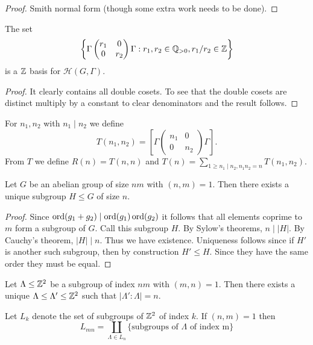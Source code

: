 \documentclass{memoir}
\begin{document}
\begin{proof}
    Smith normal form (though some extra work needs to be done).
\end{proof}
\begin{corollary}
    The set
    \begin{equation}
        \left\{ \Gamma \begin{pmatrix} r_1 & 0 \\ 0 & r_2 \end{pmatrix} \Gamma : r_1,r_2\in \mathbb{Q}_{>0}, r_1/r_2\in\mathbb{Z} \right\}
    \end{equation}
    is a $\mathbb{Z}$ basis for $\mathcal H(G,\Gamma)$.
\end{corollary}
\begin{proof}
    It clearly contains all double cosets.
    To see that the double cosets are distinct multiply by a constant to clear denominators and the result follows.
\end{proof}
\begin{notation}
    For $n_1,n_2$ with $n_1\mid n_2$ we define
    \begin{equation}
    T(n_1,n_2) = \left[ \Gamma \begin{pmatrix} n_1 & 0 \\ 0 & n_2\end{pmatrix} \Gamma \right].
    \end{equation}
    From $T$ we define $R(n) = T(n,n)$ and $T(n) = \sum_{1\ge n_1\mid n_2, n_1n_2 = n} T(n_1,n_2)$.
\end{notation}
\begin{lemma}
    Let $G$ be an abelian group of size $nm$ with $(n,m) = 1$.
    Then there exists a unique subgroup $H\le G$ of size $n$.
\end{lemma}
\begin{proof}
    Since $\operatorname{ord}(g_1+g_2)\mid \operatorname{ord}(g_1)\operatorname{ord}(g_2)$ it follows that all elements coprime to $m$ form a subgroup of $G$.
    Call this subgroup $H$.
    By Sylow's theorems, $n\mid |H|$.
    By Cauchy's theorem, $|H|\mid n$.
    Thus we have existence.
    Uniqueness follows since if $H'$ is another such subgroup, then by construction $H'\le H$.
    Since they have the same order they must be equal.
\end{proof}
\begin{corollary}
    Let $\Lambda\le \mathbb{Z}^2$ be a subgroup of index $nm$ with $(m,n)=1$. 
    Then there exists a unique $\Lambda\le\Lambda'\le \mathbb{Z}^2$ such that $|\Lambda':\Lambda| = n$.
\end{corollary}
\begin{corollary}
    \label{cor:lat}
    Let $L_k$ denote the set of subgroups of $\mathbb{Z}^2$ of index $k$.
    If $(n,m)=1$ then
    \begin{equation}
        L_{mn} = \coprod_{\Lambda\in L_n} \{\text{subgroups of $\Lambda$ of index m}\}
    \end{equation}
\end{corollary}
\end{document}
